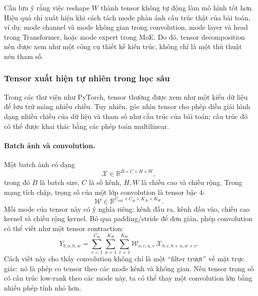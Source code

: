Cần lưu ý rằng việc reshape $W$ thành tensor không tự động làm mô hình tốt hơn.
Hiệu quả chỉ xuất hiện khi cách tách mode phản ánh cấu trúc thật của bài toán, ví dụ:
mode channel và mode không gian trong convolution, mode layer và head trong Transformer,
hoặc mode expert trong MoE. Do đó, tensor decomposition nên được xem như một công cụ
thiết kế kiến trúc, không chỉ là một thủ thuật nén tham số.

\subsubsection{Tensor xuất hiện tự nhiên trong học sâu}

Trong các thư viện như PyTorch, tensor thường được xem như một kiểu dữ liệu để lưu trữ
mảng nhiều chiều. Tuy nhiên, góc nhìn tensor cho phép diễn giải hình dạng nhiều chiều
của dữ liệu và tham số như cấu trúc của bài toán; cấu trúc đó có thể được khai thác
bằng các phép toán multilinear.

\paragraph{Batch ảnh và convolution.}
Một batch ảnh có dạng
\begin{equation}
    \mathcal{X} \in \mathbb{R}^{B \times C \times H \times W},
\end{equation}
trong đó $B$ là batch size, $C$ là số kênh, $H,W$ là chiều cao và chiều rộng. Trong mạng
tích chập, trọng số của một lớp convolution là tensor bậc 4:
\begin{equation}
    \mathcal{W} \in
    \mathbb{R}^{C_{\mathrm{out}} \times C_{\mathrm{in}} \times K_H \times K_W}.
\end{equation}
Mỗi mode của tensor này có ý nghĩa riêng: kênh đầu ra, kênh đầu vào, chiều cao kernel
và chiều rộng kernel. Bỏ qua padding/stride để đơn giản, phép convolution có thể viết
như một tensor contraction:
\begin{equation}
    Y_{b,o,h,w}
    =
    \sum_{c=1}^{C_{\mathrm{in}}}
    \sum_{u=1}^{K_H}
    \sum_{v=1}^{K_W}
    \mathcal{W}_{o,c,u,v}\,
    \mathcal{X}_{b,c,h+u,w+v}.
    \label{eq:conv-tensor-contraction}
\end{equation}
Cách viết này cho thấy convolution không chỉ là một ``filter trượt'' về mặt trực giác:
nó là phép co tensor theo các mode kênh và không gian. Nếu tensor trọng số có cấu trúc
low-rank theo các mode này, ta có thể thay một convolution lớn bằng nhiều phép tính nhỏ
hơn.


